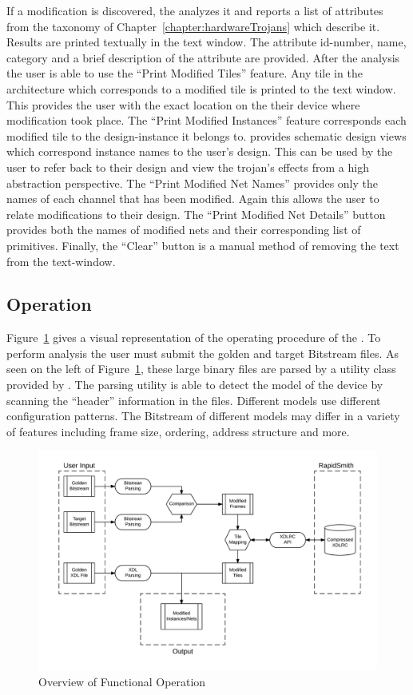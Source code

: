 If a modification is discovered, the \NameNoPeriod analyzes it and reports a list of attributes from the taxonomy of Chapter~\ref{chapter:hardwareTrojans} which describe it.
Results are printed textually in the text window.
The attribute id-number, name, category and a brief description of the attribute are provided.
After the analysis the user is able to use the ``Print Modified Tiles'' feature.
Any tile in the architecture which corresponds to a modified tile is printed to the text window. 
This provides the user with the exact location on the their device where modification took place.
The ``Print Modified Instances'' feature corresponds each modified tile to the design-instance it belongs to.
\Xilinx provides schematic design views which correspond instance names to the user's design.
This can be used by the user to refer back to their design and view the trojan's effects from a high abstraction perspective.
The ``Print Modified Net Names'' provides only the names of each channel that has been modified. 
Again this allows the user to relate modifications to their design.
The ``Print Modified Net Details'' button provides both the names of modified nets and their corresponding list of primitives.
Finally, the ``Clear'' button is a manual method of removing the text from the text-window.
\subsection{Operation} \label{sec:operation}
Figure~\ref{fig:Operation} gives a visual representation of the operating procedure of the \Name.
To perform analysis the user must submit the \gls{golden} and \gls{target} \gls{Bitstream} files.
As seen on the left of Figure~\ref{fig:Operation}, these large binary files are parsed by a utility class provided by \RapidSmith. 
The parsing utility is able to detect the model of the device by scanning the ``header'' information in the files.
Different \Xilinx models use different configuration patterns.
The \gls{Bitstream} of different models may differ in a variety of features including frame size, ordering, address structure and more.
\begin{figure}[h]
	\centering
	\includegraphics[width=1\linewidth]{Figures/Operation}
	\caption[Overview of Functional Operation]{Overview of Functional Operation}
	\label{fig:Operation}
\end{figure}

